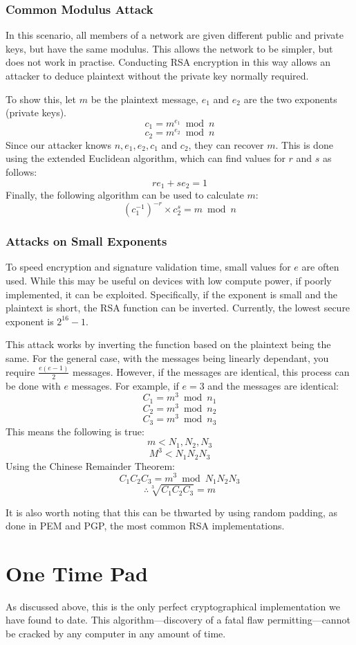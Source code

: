 			\subsubsection{Common Modulus Attack}
				In this scenario, all members of a network are given different public and private keys, but have the same modulus.
				This allows the network to be simpler, but does not work in practise. 
				Conducting RSA encryption in this way allows an attacker to deduce plaintext without the private key normally required. 

				To show this, let $m$ be the plaintext message, $e_1$ and $e_2$ are the two exponents (private keys). 
				$$c_1 = m^{e_1}\bmod{n}$$
				$$c_2 = m^{e_2}\bmod{n}$$
				Since our attacker knows $n, e_1, e_2, c_1$ and $c_2$, they can recover $m$. 
				This is done using the extended Euclidean algorithm, which can find values for $r$ and $s$ as follows:
				$$re_1 + se_2 = 1$$
				Finally, the following algorithm can be used to calculate $m$:
				$$(c^{-1}_{1})^{-r} \times c^{s}_{2} = m\bmod{n}$$

			\subsubsection{Attacks on Small Exponents}
				To speed encryption and signature validation time, small values for $e$ are often used. 
				While this may be useful on devices with low compute power, if poorly implemented, it can be exploited. 
				Specifically, if the exponent is small and the plaintext is short, the RSA function can be inverted. 
				Currently, the lowest secure exponent is $2^{16}-1$. 

				This attack works by inverting the function based on the plaintext being the same. 
				For the general case, with the messages being linearly dependant, you require $\frac{e(e-1)}{2}$ messages. 
				However, if the messages are identical, this process can be done with $e$ messages.
				For example, if $e = 3$ and the messages are identical:
				$$C_1 = m^3\bmod{n_1}$$
				$$C_2 = m^3\bmod{n_2}$$
				$$C_3 = m^3\bmod{n_3}$$
				This means the following is true:
				$$m < {N_1, N_2, N_3}$$
				$$M^3 < N_1N_2N_3$$
				Using the Chinese Remainder Theorem:
				$$C_1C_2C_3 = m^3\bmod{N_1N_2N_3}$$
				$$\therefore \sqrt[3]{C_1C_2C_3} = m$$

				It is also worth noting that this can be thwarted by using random padding, as done in PEM and PGP, the most common RSA implementations.  
	\section{One Time Pad}
		As discussed above, this is the only perfect cryptographical implementation we have found to date. 
		This algorithm---discovery of a fatal flaw permitting---cannot be cracked by any computer in any amount of time. 

